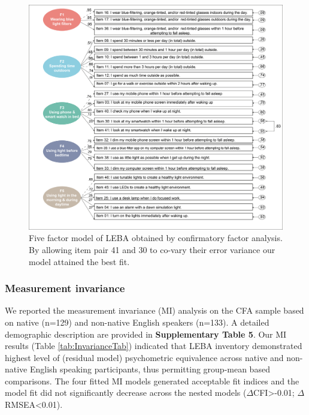 \documentclass[
  man]{apa6}
\begin{document}
\begin{figure}
\includegraphics[width=1\linewidth,height=1\textheight]{Figures/Figure5} \caption{Five factor  model of LEBA obtained by confirmatory factor analysis. By allowing item pair 41 and 30 to co-vary their error variance our model attained the best fit.}\label{fig:figcfa}
\end{figure}

\hypertarget{measurement-invariance}{%
\subsubsection{Measurement invariance}\label{measurement-invariance}}

We reported the measurement invariance (MI) analysis on the CFA sample based on native (n=129) and non-native English speakers (n=133). A detailed demographic description are provided in \textbf{Supplementary Table 5}. Our MI results (Table \ref{tab:InvarianceTab}) indicated that LEBA inventory demonstrated highest level of (residual model) psychometric equivalence across native and non-native English speaking participants, thus permitting group-mean based comparisons. The four fitted MI models generated acceptable fit indices and the model fit did not significantly decrease across the nested models (\(\Delta\)CFI\textgreater-0.01; \(\Delta\)RMSEA\textless0.01).
\end{document}
